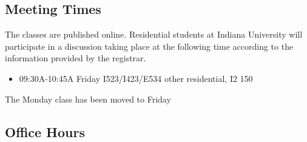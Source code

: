 \subsection{Meeting Times}\label{meeting-times}

The classes are published online. Residential students at Indiana
University will participate in a discussion taking place at the
following time according to the information provided by the registrar.

\begin{itemize}

\item
  09:30A-10:45A Friday I523/I423/E534 other residential, I2 150
\end{itemize}

The Monday class has been moved to Friday

\subsection{Office Hours}\label{office-hours}

